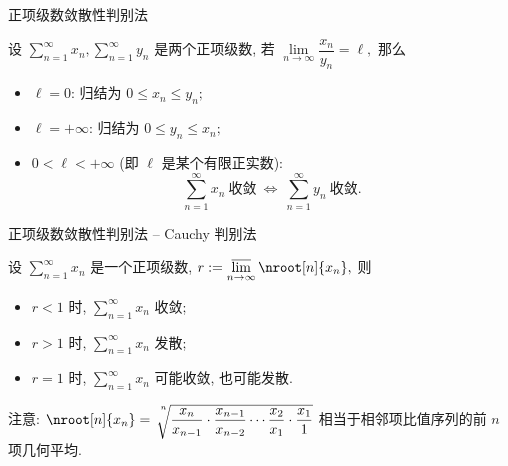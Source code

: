\begin{frame}{正项级数敛散性判别法}

\begin{thm}[比较判别法的极限形式]
设 $\sum\limits_{n=1}^{\infty} x_n, \sum\limits_{n=1}^{\infty} y_n$ 是两个正项级数, 若 $\lim\limits_{n\to\infty} \dfrac{x_n}{y_n} = \ell,$ 那么
\begin{itemize}
\item $\ell = 0$:
\pause
归结为 $0 \leqslant x_n \leqslant y_n;$
\item $\ell = +\infty$:
\pause
归结为 $0 \leqslant y_n \leqslant x_n;$
\pause
\item $0 < \ell < +\infty$ (即 $\ell$ 是某个有限正实数):
\pause
\[\sum\limits_{n=1}^{\infty} x_n ~ \text{收敛} ~ \Longleftrightarrow ~ \sum\limits_{n=1}^{\infty} y_n ~ \text{收敛}.\]
\end{itemize}
\end{thm}

\end{frame}


\begin{frame}{正项级数敛散性判别法 -- Cauchy 判别法}

\begin{thm}
设 $\sum\limits_{n=1}^{\infty} x_n$ 是一个正项级数, $r := \varlimsup\limits_{n\to\infty} \nroot[n]{x_n},$ 则
\begin{itemize}
\item $r < 1$ 时, $\sum\limits_{n=1}^{\infty} x_n$ 收敛;
\item $r > 1$ 时, $\sum\limits_{n=1}^{\infty} x_n$ 发散;
\item $r = 1$ 时, $\sum\limits_{n=1}^{\infty} x_n$ 可能收敛, 也可能发散.
\end{itemize}
\end{thm}

注意: $\nroot[n]{x_n} = \sqrt[\leftroot{-3}\uproot{15}n]{\dfrac{x_n}{x_{n-1}} \cdot \dfrac{x_{n-1}}{x_{n-2}} \cdots \dfrac{x_2}{x_1} \cdot \dfrac{x_1}{1}}$ 相当于相邻项比值序列的前 $n$ 项几何平均.

\end{frame}


